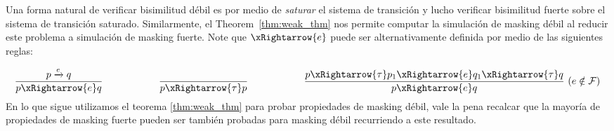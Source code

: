 Una forma natural de verificar bisimilitud débil es por medio de \emph{saturar}
el sistema de transición  \cite{FernandezM91,Milner89} y lucho verificar bisimilitud fuerte sobre el sistema de transición saturado.
Similarmente, el Theorem~\ref{thm:weak_thm} nos permite computar la simulación de masking débil al reducir este problema a simulación de masking fuerte. Note que $\xRightarrow{e}$ puede ser alternativamente definida por medio de las siguientes reglas:

\[
\dfrac{p \xrightarrow{e} q}{p\xRightarrow{e} q} \hspace{2cm} 
\dfrac{}{p\xRightarrow{\tau} p} \hspace{2cm} 
\dfrac{p\xRightarrow{\tau} p_1 \xRightarrow{e} q_1 \xRightarrow{\tau} q}{p\xRightarrow{e} q}~(e \notin \Faults)
\]
	En lo que sigue utilizamos el teorema \ref{thm:weak_thm} para probar propiedades de masking débil, vale la pena recalcar que la mayoría de propiedades de masking fuerte pueden ser también probadas para masking débil recurriendo a este resultado.
	
